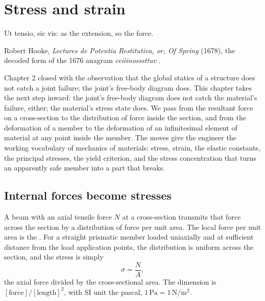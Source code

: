 \chapter{Stress and strain}
\label{vol03:ch03}

\epigraph{Ut tensio, sic vis: as the extension, so the force.}{Robert
Hooke, \emph{Lectures de Potentia Restitutiva, or, Of Spring} (1678),
the decoded form of the 1676 anagram \emph{ceiiinosssttuv}
\cite{hist:hooke1678}.}


\noindent
Chapter 2 closed with the observation that the global statics of a
structure does not catch a joint failure; the joint's free-body
diagram does. This chapter takes the next step inward: the joint's
free-body diagram does not catch the material's failure, either; the
material's stress state does. We pass from the resultant force on a
cross-section to the distribution of force inside the section, and
from the deformation of a member to the deformation of an
infinitesimal element of material at any point inside the member. The
moves give the engineer the working vocabulary of mechanics of
materials: stress, strain, the elastic constants, the principal
stresses, the yield criterion, and the stress concentration that
turns an apparently safe member into a part that breaks.

\section{Internal forces become stresses}

A beam with an axial tensile force $N$ at a cross-section transmits
that force across the section by a distribution of force per unit
area. The local force per unit area is the . For a
straight prismatic member loaded uniaxially and at sufficient distance
from the load application points, the distribution is uniform across
the section, and the stress is simply
\[
\sigma = \frac{N}{A},
\]
the axial force divided by the cross-sectional area. The dimension is
$[\text{force}]/[\text{length}]^2$, with SI unit the pascal,
$1\,\si{\pascal} = 1\,\si{\newton\per\meter\squared}$.

